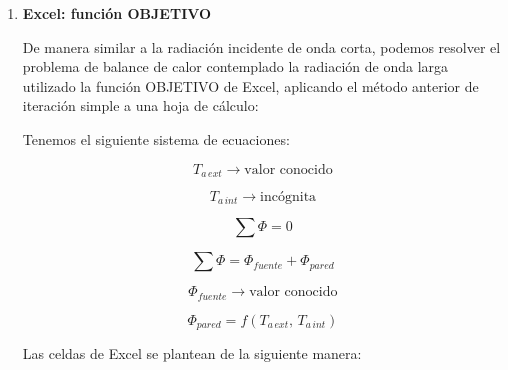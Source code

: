 \documentclass[11pt]{article}
\begin{document}
\begin{enumerate}
    \item
    \textbf{Excel: función OBJETIVO}

    De manera similar a la radiación incidente de onda corta, podemos resolver el problema de balance de calor contemplado la radiación de onda larga utilizado la función OBJETIVO de Excel, aplicando el método anterior de iteración simple a una hoja de cálculo:

    Tenemos el siguiente sistema de ecuaciones:

    \[ T_{ a \, ext } \longrightarrow \text{valor conocido} \]

    \[ T_{ a \, int } \longrightarrow \text{incógnita} \]

    \[ \sum{ \Phi } = 0 \]

    \[ \sum{ \Phi } = \Phi _{ fuente } + \Phi _{ pared } \]

    \[ \Phi _{ fuente } \longrightarrow \text{valor conocido} \]

    \[ \Phi _{ pared } = f \left( T_{ a \, ext }, \, T_{ a \, int } \right) \]

    Las celdas de Excel se plantean de la siguiente manera:


\end{enumerate}
\end{document}
